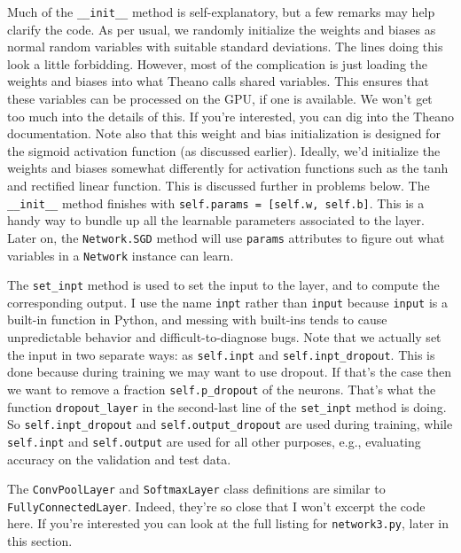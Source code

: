 Much of the \texttt{\_\allowbreak{}\_\allowbreak{}init\_\allowbreak{}\_\allowbreak{}} method is self-explanatory, but a few remarks may help clarify the code. As per usual, we randomly initialize the weights and biases as normal random variables with suitable standard deviations. The lines doing this look a little forbidding. However, most of the complication is just loading the weights and biases into what Theano calls shared variables. This ensures that these variables can be processed on the GPU, if one is available. We won't get too much into the details of this. If you're interested, you can dig into the Theano documentation. Note also that this weight and bias initialization is designed for the sigmoid activation function (as discussed earlier). Ideally, we'd initialize the weights and biases somewhat differently for activation functions such as the tanh and rectified linear function. This is discussed further in problems below. The \texttt{\_\allowbreak{}\_\allowbreak{}init\_\allowbreak{}\_\allowbreak{}} method finishes with \texttt{self.params = [self.w, self.b]}. This is a handy way to bundle up all the learnable parameters associated to the layer. Later on, the \texttt{Network.SGD} method will use \texttt{params} attributes to figure out what variables in a \texttt{Network} instance can learn.


The \texttt{set\_\allowbreak{}inpt} method is used to set the input to the layer, and to compute the corresponding output. I use the name \texttt{inpt} rather than \texttt{input} because \texttt{input} is a built-in function in Python, and messing with built-ins tends to cause unpredictable behavior and difficult-to-diagnose bugs. Note that we actually set the input in two separate ways: as \texttt{self.inpt} and \texttt{self.inpt\_\allowbreak{}dropout}. This is done because during training we may want to use dropout. If that's the case then we want to remove a fraction \texttt{self.p\_\allowbreak{}dropout} of the neurons. That's what the function \texttt{dropout\_\allowbreak{}layer} in the second-last line of the \texttt{set\_\allowbreak{}inpt} method is doing. So \texttt{self.inpt\_\allowbreak{}dropout} and \texttt{self.output\_\allowbreak{}dropout} are used during training, while \texttt{self.inpt} and \texttt{self.output} are used for all other purposes, e.g., evaluating accuracy on the validation and test data.


The \texttt{ConvPoolLayer} and \texttt{SoftmaxLayer} class definitions are similar to \texttt{FullyConnectedLayer}. Indeed, they're so close that I won't excerpt the code here. If you're interested you can look at the full listing for \texttt{network3.py}, later in this section.


